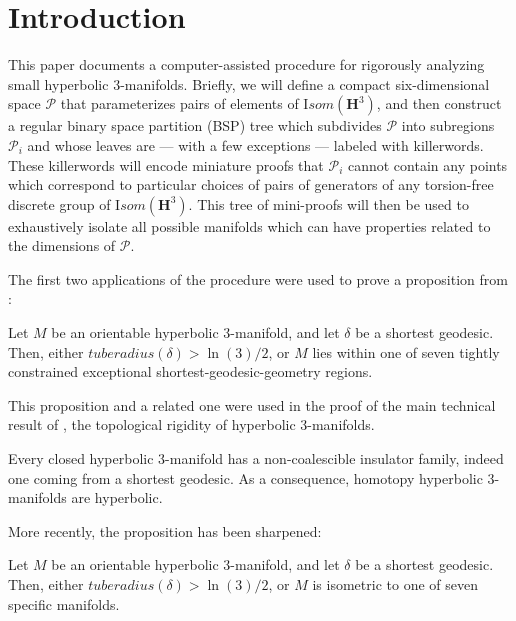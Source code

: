 \def\Arccosh{{\mathrm Arccosh}}
\chapter{Introduction}

This paper documents a computer-assisted procedure
for rigorously analyzing small hyperbolic $3$-manifolds.
Briefly, we will define a compact six-dimensional space ${\mathcal P}$
that parameterizes pairs of elements of ${\mathrm Isom}({\mathbf H}^3)$,
and then construct a regular binary space partition (BSP) tree
which subdivides ${\mathcal P}$ into subregions ${\mathcal P_i}$
and whose leaves are --- with a few exceptions --- labeled with killerwords.
These killerwords will encode miniature proofs that ${\mathcal P_i}$
cannot contain any points which correspond to
particular choices of pairs of generators of
any torsion-free discrete group of ${\mathrm Isom}({\mathbf H}^3)$.
This tree of mini-proofs will then be used
to exhaustively isolate all possible manifolds
which can have properties related to the dimensions of ${\mathcal P}$.

The first two applications of the procedure
were used to prove a proposition from \cite{GMT}:

\begin{proposition}{\cite{GMT}}
Let $M$ be an orientable hyperbolic $3$-manifold, and let $\delta$ be
a shortest geodesic. Then, either ${\mathit tuberadius}(\delta) > \ln(3)/2$,
or $M$ lies within one of seven tightly constrained
exceptional shortest-geodesic-geometry regions.
\end{proposition}

This proposition and a related one were used in the proof of
the main technical result of \cite{GMT}, the topological rigidity of hyperbolic 3-manifolds. 

\begin{theorem}{\cite{GMT}}\label{GMT 0.2}
Every closed hyperbolic $3$-manifold
has a non-coalescible insulator family,
indeed one coming from a shortest geodesic.
As a consequence,
homotopy hyperbolic $3$-manifolds are hyperbolic.
\end{theorem}

More recently, the proposition has been sharpened:

\begin{theorem}{}
Let $M$ be an orientable hyperbolic $3$-manifold,
and let $\delta$ be a shortest geodesic.
Then, either ${\mathit tuberadius}(\delta) > \ln(3)/2$, or
$M$ is isometric to one of seven specific manifolds.
\end{theorem}

